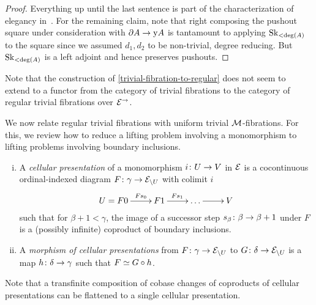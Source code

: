 \documentclass[reqno,10pt,a4paper,oneside,draft]{amsart}
\begin{document}
\begin{proof}
Everything up until the last sentence is part of the characterization of elegancy in~\cite[Proposition~3.8]{bergner-rezk-elegant}.
For the remaining claim, note that right composing the pushout square under consideration with $\partial A \to \yon A$ is tantamount to applying $\Sk_{<\deg(A)}$ to the square since we assumed $d_1, d_2$ to be non-trivial, \ie degree reducing.
But $\Sk_{<\deg(A)}$ is a left adjoint and hence preserves pushouts.
\end{proof}

Note that the construction of \cref{trivial-fibration-to-regular} does not seem to extend to a functor from the category of trivial fibrations to the category of regular trivial fibrations over $\catE^{\to}$.

\medskip

We  now relate regular trivial fibrations with uniform trivial $\cal{M}$-fibrations.
For this, we review how to reduce a lifting problem involving a monomorphism to lifting problems involving boundary inclusions.

\begin{definition} \hfill 
\begin{enumerate}[(i)] 
\item A \emph{cellular presentation} of a monomorphism $i \co U \to V$ in $\catE$ is a cocontinuous ordinal-indexed diagram $F \co \gamma \to \catE_{\backslash U}$ with colimit $i$
\[
\xymatrix{
  U = F 0
  \ar[r]^-{F s_0}
&
  F 1
  \ar[r]^{F s_1}
&
  \ldots
  \ar[r]
&
  V
}
\]
such that for $\beta + 1 < \gamma$, the image of a successor step $s_{\beta} \co \beta \to \beta + 1$ under $F$ is a (possibly infinite) coproduct of boundary inclusions.
\item A \emph{morphism of cellular presentations} from $F \co \gamma \to \cal{E}_{\backslash U}$ to $G \co \delta \to \cal{E}_{\backslash U}$ is a map $h \co \delta \to \gamma$ such that $F \simeq G \cc h$.
\end{enumerate}
\end{definition}

Note that a transfinite composition of cobase changes of coproducts of cellular presentations can be flattened to a single cellular presentation.
\end{document}
